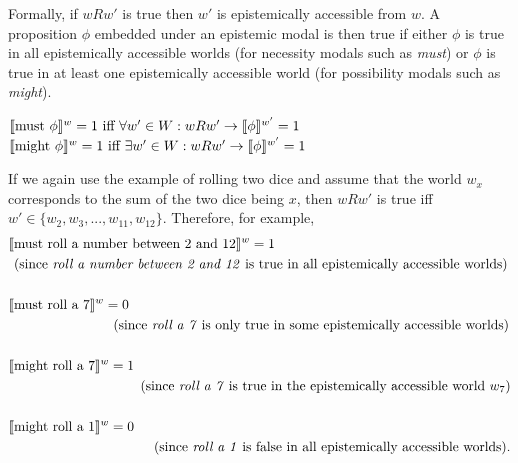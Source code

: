 Formally, if $wRw'$ is true then $w'$ is epistemically accessible from $w$. A proposition $\phi$ embedded under an epistemic modal is then true
if either $\phi$ is  true in all epistemically accessible worlds (for necessity modals such as \textit{must}) or $\phi$ is true in at least one epistemically 
accessible world (for possibility modals such as \textit{might}).

\begin{exe}
\ex \label{ex:modall-must} $\llbracket\mbox{must } \phi\rrbracket^{w}  = 1 \mbox{ iff } \forall w' \in W: wRw' \rightarrow  \llbracket\phi\rrbracket^{w'} = 1$
\ex \label{ex:modall-might} $\llbracket\mbox{might } \phi\rrbracket^{w}  = 1 \mbox{ iff } \exists w' \in W: wRw' \rightarrow  \llbracket\phi\rrbracket^{w'} = 1$
\end{exe}

If we again use the example of rolling two dice and assume that the world $w_x$ corresponds to the sum 
of the two dice being $x$, then $wRw'$ is true iff $w' \in \{w_2, w_3, ..., w_{11}, w_{12}\}$. Therefore, for example,
\begin{align*}
\llbracket&\mbox{must roll a number between 2 and 12}\rrbracket^{w} =  1 \\
 & \mbox{(since \textit{roll a number between 2 and 12} is true in all epistemically accessible worlds)} \\ \\ 
 \llbracket&\mbox{must roll a 7}\rrbracket^{w} =  0 \\
 & \qquad \qquad \qquad \quad \mbox{ (since \textit{roll a 7} is only true in some epistemically accessible worlds)} \\ \\
 \llbracket&\mbox{might roll a 7}\rrbracket^{w} =  1 \\
 &  \qquad \qquad \qquad \qquad \quad \mbox{ (since \textit{roll a 7} is true in the epistemically accessible world }w_7\mbox{)}\\ \\ 
 \llbracket&\mbox{might roll a 1}\rrbracket^{w} =  0 \\
 &  \qquad \qquad \qquad \qquad \qquad \mbox{\  (since \textit{roll a 1} is false in all epistemically accessible worlds).}
\end{align*}

